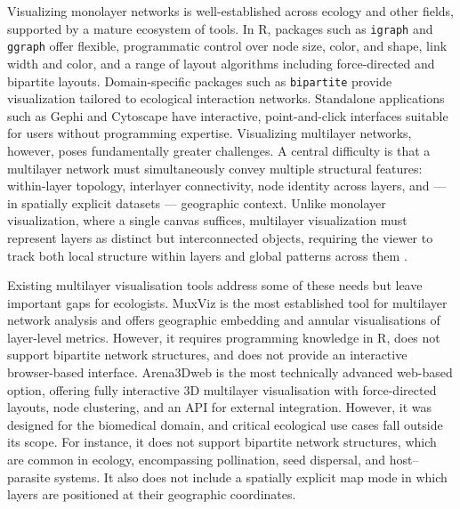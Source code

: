 \documentclass{article}
\begin{document}
Visualizing monolayer networks is well-established across ecology and other fields, supported by a mature ecosystem of tools. In R, packages such as \texttt{igraph} \cite{Csardi2006} and \texttt{ggraph} offer flexible, programmatic control over node size, color, and shape, link width and color, and a range of layout algorithms including force-directed and bipartite layouts. Domain-specific packages such as \texttt{bipartite} \cite{Dormann2008} provide visualization tailored to ecological interaction networks. Standalone applications such as Gephi and Cytoscape have interactive, point-and-click interfaces suitable for users without programming expertise. Visualizing multilayer networks, however, poses fundamentally greater challenges. A central difficulty is that a multilayer network must simultaneously convey multiple structural features: within-layer topology, interlayer connectivity, node identity across layers, and — in spatially explicit datasets — geographic context. Unlike monolayer visualization, where a single canvas suffices, multilayer visualization must represent layers as distinct but interconnected objects, requiring the viewer to track both local structure within layers and global patterns across them \cite{McGee2019-yr}. 

Existing multilayer visualisation tools address some of these needs but leave important gaps for ecologists. MuxViz \cite{De-Domenico2015-jj}  is the most established tool for multilayer network analysis and offers geographic embedding and annular visualisations of layer-level metrics. However, it requires programming knowledge in R, does not support bipartite network structures, and does not provide an interactive browser-based interface. Arena3Dweb \cite{Karatzas2021-yr, Kokoli2023-fu} is the most technically advanced web-based option, offering fully interactive 3D multilayer visualisation with force-directed layouts, node clustering, and an API for external integration. However, it was designed for the biomedical domain, and critical ecological use cases fall outside its scope. For instance, it does not support bipartite network structures, which are common in ecology, encompassing pollination, seed dispersal, and host–parasite systems. It also does not include a spatially explicit map mode in which layers are positioned at their geographic coordinates.
\end{document}
